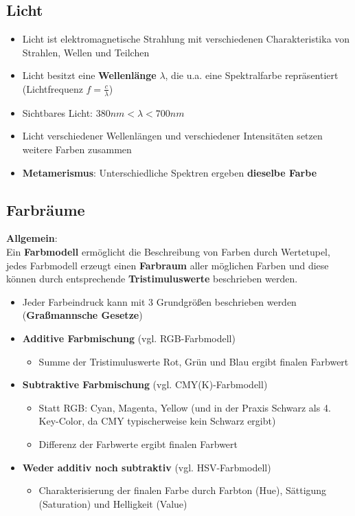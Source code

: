 \documentclass[10pt,a4paper]{article}
\begin{document}
	\subsection{Licht}
	\label{bfp:sub:licht}

	\begin{itemize}
		\item Licht ist elektromagnetische Strahlung mit verschiedenen Charakteristika von Strahlen, Wellen und Teilchen
		\item Licht besitzt eine \textbf{Wellenlänge} $\lambda$, die u.a. eine Spektralfarbe repräsentiert\\(Lichtfrequenz $f = \frac{c}{\lambda}$)
		\item Sichtbares Licht: $380nm < \lambda < 700nm$
		\item Licht verschiedener Wellenlängen und verschiedener Intensitäten setzen weitere Farben zusammen
		\item \textbf{Metamerismus}: Unterschiedliche Spektren ergeben \textbf{dieselbe Farbe}
        \end{itemize}


	\subsection{Farbräume}
	\label{bfp:sub:farbraeume}

	\textbf{Allgemein}:\\
	Ein \textbf{Farbmodell} ermöglicht die Beschreibung von Farben durch Wertetupel, jedes Farbmodell erzeugt einen \textbf{Farbraum} aller möglichen Farben und diese können durch entsprechende \textbf{Tristimuluswerte} beschrieben werden.

	\begin{itemize}
		\item Jeder Farbeindruck kann mit 3 Grundgrößen beschrieben werden (\textbf{Graßmannsche Gesetze})
		\item \textbf{Additive Farbmischung} (vgl. RGB-Farbmodell)
		\begin{itemize}
			\item Summe der Tristimuluswerte Rot, Grün und Blau ergibt finalen Farbwert
		\end{itemize}
		\item \textbf{Subtraktive Farbmischung} (vgl. CMY(K)-Farbmodell)
		\begin{itemize}
			\item Statt RGB: Cyan, Magenta, Yellow (und in der Praxis Schwarz als 4. Key-Color, da CMY typischerweise kein Schwarz ergibt)
			\item Differenz der Farbwerte ergibt finalen Farbwert
		\end{itemize}
		\item \textbf{Weder additiv noch subtraktiv} (vgl. HSV-Farbmodell)
		\begin{itemize}
			\item Charakterisierung der finalen Farbe durch Farbton (Hue), Sättigung (Saturation) und Helligkeit (Value)
		\end{itemize}
	\end{itemize}
\end{document}

